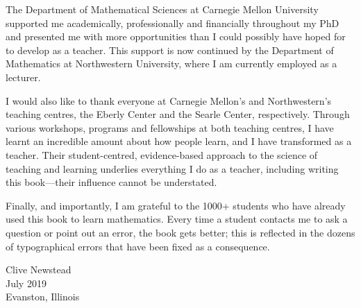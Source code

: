 The Department of Mathematical Sciences at Carnegie Mellon University supported me academically, professionally and financially throughout my PhD and presented me with more opportunities than I could possibly have hoped for to develop as a teacher. This support is now continued by the Department of Mathematics at Northwestern University, where I am currently employed as a lecturer.

I would also like to thank everyone at Carnegie Mellon's and Northwestern's teaching centres, the Eberly Center and the Searle Center, respectively. Through various workshops, programs and fellowships at both teaching centres, I have learnt an incredible amount about how people learn, and I have transformed as a teacher. Their student-centred, evidence-based approach to the science of teaching and learning underlies everything I do as a teacher, including writing this book---their influence cannot be understated.

Finally, and importantly, I am grateful to the 1000+ students who have already used this book to learn mathematics. Every time a student contacts me to ask a question or point out an error, the book gets better; this is reflected in the dozens of typographical errors that have been fixed as a consequence.

\begin{flushright}
Clive Newstead\\
July 2019\\
Evanston, Illinois
\end{flushright}